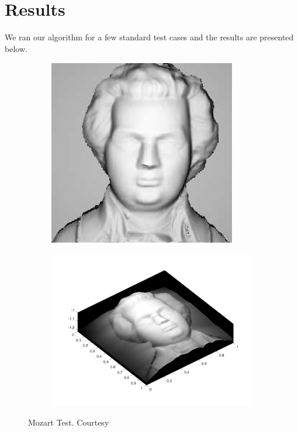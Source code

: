 \documentclass{article}[11pt]
\begin{document}
\section{Results}
We ran our algorithm for a few standard test cases and the results are presented below.
\begin{figure}[h!]
	\begin{subfigure}{0.5\textwidth}
		\centering
		\includegraphics[scale = 0.6]{moz.png}
	\end{subfigure}
	\begin{subfigure}{0.5\textwidth}
		\centering
		\includegraphics[scale = 0.2]{moz.jpg}
	\end{subfigure}
	\caption{Mozart Test. Courtesy \cite{prados}}
	\label{fig:1}
\end{figure}
\end{document}
